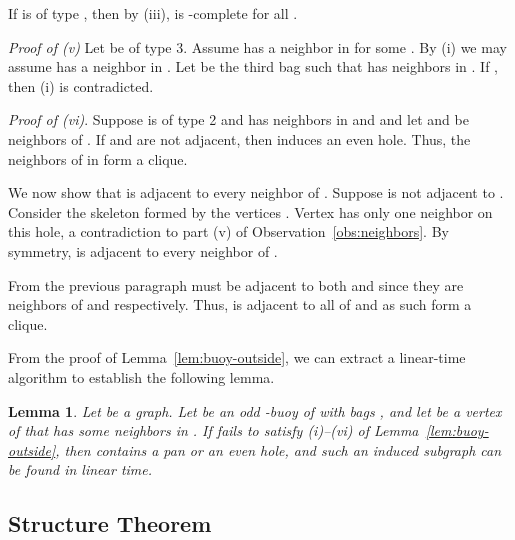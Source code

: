 \documentclass[11pt,a4paper]{article}
\def\qed{\hfill \vspace{2ex}}
\newtheorem{lemma}[theorem]{Lemma}
\newenvironment{proof}{\noindent {\it Proof:~}}{\hfill \smallskip\par}
\begin{document}
\begin{proof}
If  is of type , then by (iii),  is -complete for
all . \qed

\textit{Proof of (v)} Let  be of type 3. Assume  has a
neighbor in  for some . By (i) we may assume  has a
neighbor in . Let  be the third bag such that 
has neighbors in . If , then (i) is
contradicted. \qed

\textit{Proof of (vi)}. Suppose  is of type 2 and has neighbors
in  and  and let  and  be neighbors of . If  and  are not
adjacent, then     
 induces an even hole. Thus, the neighbors of  in
 form a clique.

We now show that  is adjacent to every neighbor  of . Suppose  is not adjacent to .
Consider the skeleton  formed by the vertices . Vertex  has only one
neighbor on this hole, a contradiction to part (v) of
Observation~\ref{obs:neighbors}. By symmetry,  is adjacent to
every neighbor  of .

From the previous paragraph  must be adjacent to both  and
 since they are neighbors  of  and 
respectively. Thus,  is adjacent to all of 
and as such  form a clique.
\end{proof}
From the proof of Lemma~\ref{lem:buoy-outside}, we can extract a
linear-time algorithm to establish the following lemma.
\begin{lemma}\label{lem:find-buoy-outside}
Let  be a graph. Let  be an odd -buoy of  with bags
, and let  be a
vertex of  that has some neighbors in . If  fails to
satisfy (i)--(vi) of Lemma~\ref{lem:buoy-outside}, then 
contains a pan or an even hole, and such an induced subgraph can
be found in linear time. \hfill 
\end{lemma}

\subsection{Structure Theorem}
\label{sec:structure}
\end{document}

